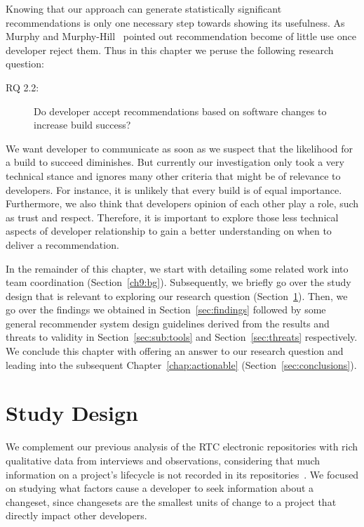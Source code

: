 \label{chap:talk}
Knowing that our approach can generate statistically significant recommendations is only one necessary step towards showing its usefulness.
As Murphy and Murphy-Hill~\cite{murphy:rsse:2010} pointed out recommendation become of little use once developer reject them.
Thus in this chapter we peruse the following research question:

\begin{description}
  \item[RQ 2.2:] Do developer accept recommendations based on software changes to increase build success? 
\end{description}

We want developer to communicate as soon as we suspect that the likelihood for a build to succeed diminishes.
But currently our investigation only took a very technical stance and ignores many other criteria that might be of relevance to developers.
For instance, it is unlikely that every build is of equal importance.
Furthermore, we also think that developers opinion of each other play a role, such as trust and respect.
Therefore, it is important to explore those less technical aspects of developer relationship to gain a better understanding on when to deliver a recommendation.

In the remainder of this chapter, we start with detailing some related work into team coordination (Section~\ref{ch9:bg}).
Subsequently, we briefly go over the study design that is relevant to exploring our research question (Section~\ref{sec:studydesign}).
Then, we go over the findings we obtained in Section~\ref{sec:findings} followed by some general recommender system design guidelines derived from the results and threats to validity in Section~\ref{sec:sub:tools} and Section~\ref{sec:threats} respectively.
We conclude this chapter with offering an answer to our research question and leading into the subsequent Chapter~\ref{chap:actionable} (Section~\ref{sec:conclusions}).


\section{Study Design}
\label{sec:studydesign}
We complement our previous analysis of the RTC electronic repositories with rich qualitative data from interviews and observations, considering that much information on a project's lifecycle is not recorded in its repositories~\cite{aranda:icse:2009}. We focused on studying what factors cause a developer to seek information about a changeset, since changesets are the smallest units of change to a project that directly impact other developers.

